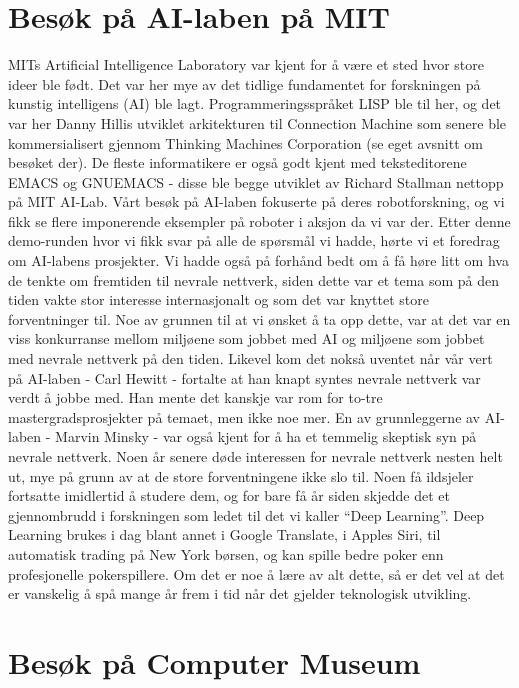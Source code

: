 \section{Besøk på AI-laben på MIT}

MITs Artificial Intelligence Laboratory var kjent for å være et sted hvor store ideer ble født. Det var her mye av det tidlige fundamentet for forskningen på kunstig intelligens (AI) ble lagt. Programmeringsspråket LISP ble til her, og det var her Danny Hillis utviklet arkitekturen til Connection Machine som senere ble kommersialisert gjennom Thinking Machines Corporation (se eget avsnitt om besøket der). De fleste informatikere er også godt kjent med teksteditorene EMACS og GNUEMACS - disse ble begge utviklet av Richard Stallman nettopp på MIT AI-Lab. Vårt besøk på AI-laben fokuserte på deres robotforskning, og vi fikk se flere imponerende eksempler på roboter i aksjon da vi var der. Etter denne demo-runden hvor vi fikk svar på alle de spørsmål vi hadde, hørte vi et foredrag om AI-labens prosjekter. Vi hadde også på forhånd bedt om å få høre litt om hva de tenkte om fremtiden til nevrale nettverk, siden dette var et tema som på den tiden vakte stor interesse internasjonalt og som det var knyttet store forventninger til. Noe av grunnen til at vi ønsket å ta opp dette, var at det var en viss konkurranse mellom miljøene som jobbet med AI og miljøene som jobbet med nevrale nettverk på den tiden. Likevel kom det nokså uventet når vår vert på AI-laben - Carl Hewitt - fortalte at han knapt syntes nevrale nettverk var verdt å jobbe med. Han mente det kanskje var rom for to-tre mastergradsprosjekter på temaet, men ikke noe mer. En av grunnleggerne av AI-laben - Marvin Minsky - var også kjent for å ha et temmelig skeptisk syn på nevrale nettverk. Noen år senere døde interessen for nevrale nettverk nesten helt ut, mye på grunn av at de store forventningene ikke slo til. Noen få ildsjeler fortsatte imidlertid å studere dem, og for bare få år siden skjedde det et gjennombrudd i forskningen som ledet til det vi kaller “Deep Learning”. Deep Learning brukes i dag blant annet i Google Translate, i Apples Siri, til automatisk trading på New York børsen, og kan spille bedre poker enn profesjonelle pokerspillere. Om det er noe å lære av alt dette, så er det vel at det er vanskelig å spå mange år frem i tid når det gjelder teknologisk utvikling.

\section{Besøk på Computer Museum}

